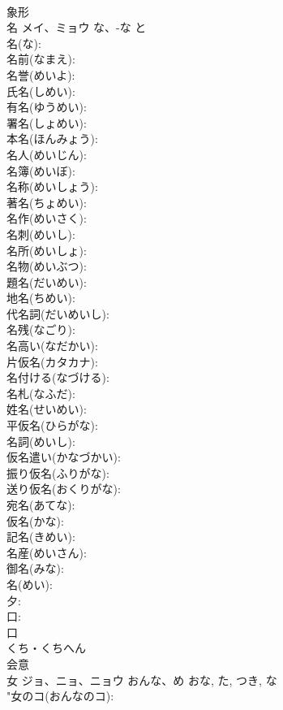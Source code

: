 \documentclass[8pt]{extreport}
\begin{document}
\begin{CJK}{UTF8}{min}
\\	象形 
\\	名	メイ、ミョウ	な、-な	と	
\\	名(な): 
\\	名前(なまえ): 
\\	名誉(めいよ): 
\\	氏名(しめい): 
\\	有名(ゆうめい): 
\\	署名(しょめい): 
\\	本名(ほんみょう): 
\\	名人(めいじん): 
\\	名簿(めいぼ): 
\\	名称(めいしょう): 
\\	著名(ちょめい): 
\\	名作(めいさく): 
\\	名刺(めいし): 
\\	名所(めいしょ): 
\\	名物(めいぶつ): 
\\	題名(だいめい): 
\\	地名(ちめい): 
\\	代名詞(だいめいし): 
\\	名残(なごり): 
\\	名高い(なだかい): 
\\	片仮名(カタカナ): 
\\	名付ける(なづける): 
\\	名札(なふだ): 
\\	姓名(せいめい): 
\\	平仮名(ひらがな): 
\\	名詞(めいし): 
\\	仮名遣い(かなづかい): 
\\	振り仮名(ふりがな): 
\\	送り仮名(おくりがな): 
\\	宛名(あてな): 
\\	仮名(かな): 
\\	記名(きめい): 
\\	名産(めいさん): 
\\	御名(みな): 
\\	名(めい): 
\\	夕: 
\\	口: 
\\	口	
\\	くち・くちへん	
\\	会意 
\\	女	ジョ、ニョ、ニョウ	おんな、め	おな, た, つき, な	
\\	"女のコ(おんなのコ): 

\end{CJK}
\end{document}
